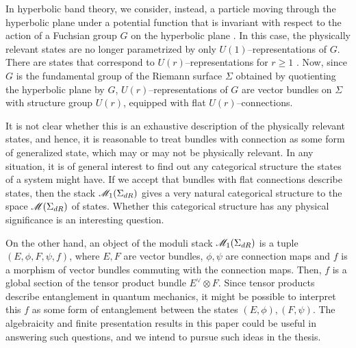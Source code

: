 \documentclass[11pt]{amsart}
\begin{document}
In hyperbolic band theory, we consider, instead, a particle moving through
the hyperbolic plane under a potential function that is invariant with respect
to the action of a Fuchsian group $G$ on the hyperbolic plane
\cite{HyperbolicBandTheory}. In this case, the physically relevant states
are no longer parametrized by only $U(1)$--representations of $G$. There are
states that correspond to $U(r)$--representations for $r \geq 1$
\cite{AutBlochTheorems}. Now, since $G$ is the fundamental group of the
Riemann surface $\Sigma$ obtained by quotienting the hyperbolic plane by $G$,
$U(r)$--representations of $G$ are vector bundles on $\Sigma$ with structure
group $U(r)$, equipped with flat $U(r)$--connections.

It is not clear whether this is an exhaustive
description of the physically relevant states, and hence, it is reasonable
to treat bundles with connection as some form of generalized state,
which may or may not be physically relevant.
In any situation, it is of general interest to find out any categorical
structure the states of a system might have.
If we accept that bundles with flat connections
describe states, then the stack $\mathscr{M}_1(\Sigma_{dR})$ gives a very
natural categorical structure to the space $\mathscr{M}(\Sigma_{dR})$ of states.
Whether this categorical structure has any physical significance is an
interesting question.

On the other hand,
an object of the moduli stack $\mathscr{M}_1(\Sigma_{dR})$ is
a tuple $(E, \phi, F, \psi, f)$, where $E, F$ are vector bundles,
$\phi, \psi$ are connection maps and $f$ is a morphism of vector bundles
commuting with the connection maps.
Then, $f$ is a global section of the tensor product bundle
$E^\vee \otimes F$. Since tensor products describe entanglement
in quantum mechanics, it might be possible to
interpret this $f$ as some form of entanglement between the states
$(E, \phi), (F, \psi)$.
The algebraicity and finite presentation results
in this paper could be useful in answering such questions, and
we intend to pursue such ideas in the thesis.

\printbibliography
\end{document}
